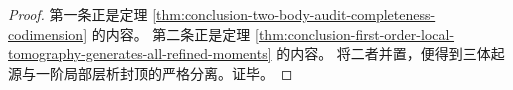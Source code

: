 \begin{proof}
第一条正是定理 \ref{thm:conclusion-two-body-audit-completeness-codimension} 的内容。
第二条正是定理 \ref{thm:conclusion-first-order-local-tomography-generates-all-refined-moments} 的内容。
将二者并置，便得到三体起源与一阶局部层析封顶的严格分离。证毕。
\end{proof}



\endinput
